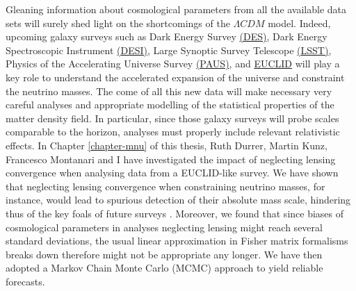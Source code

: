 Gleaning information about cosmological parameters from all the available data sets will surely shed light on the shortcomings of the $\Lambda CDM$ model. Indeed, upcoming galaxy surveys such as Dark Energy Survey \href{www.darkenergysurvey.org}{(DES)}, Dark Energy Spectroscopic Instrument \href{http://desi.lbl.gov/}{(DESI)}, Large Synoptic Survey Telescope \href{www.lsst.org}{(LSST)}, Physics of the Accelerating Universe Survey \href{www.pausurvey.org}{(PAUS)}, and \href{www.euclid-ec.org}{EUCLID} will play a key role to understand the accelerated expansion of the universe and constraint the neutrino masses. The come of all this new data will make necessary very careful analyses and appropriate modelling of the statistical properties of the matter density field. In particular, since those galaxy surveys will probe scales comparable to the horizon, analyses must properly include relevant relativistic effects. In Chapter \ref{chapter-mnu} of this thesis, Ruth Durrer, Martin Kunz, Francesco Montanari and I have investigated the impact of neglecting lensing convergence when analysing data from a EUCLID-like survey. We have shown that neglecting lensing convergence when constraining neutrino masses, for instance, would lead to spurious detection of their absolute mass scale, hindering thus of the key foals of future surveys \cite{Cardona:2016qxn}. Moreover, we found that since biases of cosmological parameters in analyses neglecting lensing might reach several standard deviations, the usual linear approximation in Fisher matrix formalisms breaks down therefore might not be appropriate any longer. We have then adopted a Markov Chain Monte Carlo (MCMC) approach to yield reliable forecasts.

